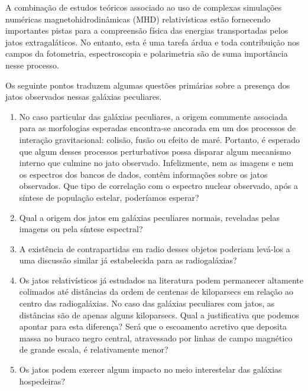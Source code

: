 A combinação de estudos teóricos \cite{blandford1977electromagnetic,blandford1982hydromagnetic,  begelman1984theory,  punsly1990ergosphere, ferrari1998modeling, meier2001magnetohydrodynamic} associado ao uso de complexas simulações numéricas magnetohidrodinâmicas (MHD) relativísticas \cite{koide2000general, koide2003magnetic, mckinney2004measurement, de2005magnetically, komissarov2005observations, hawley2006magnetically, mckinney2006general, mckinney2007disc, punsly2007three, tchekhovskoy2008simulations} estão fornecendo importantes pistas para a compreensão física das energias transportadas pelos jatos extragaláticos. No entanto, esta é uma tarefa árdua e toda contribuição nos campos da fotometria, espectroscopia e polarimetria são de suma importância nesse processo.

Os seguinte pontos traduzem algumas questões primárias sobre a presença dos jatos observados nessas galáxias peculiares.

\begin{enumerate}
    
    \item No caso particular das galáxias peculiares, a origem comumente associada para as morfologias esperadas encontra-se ancorada em um dos processos de interação gravitacional: colisão, fusão ou efeito de maré. Portanto, é esperado que algum desses processos perturbativos possa disparar algum mecanismo interno que culmine no jato observado. Infelizmente, nem as imagens e nem os espectros dos bancos de dados, contêm informações sobre os jatos observados. Que tipo de correlação com o espectro nuclear observado, após a síntese de população estelar, poderíamos esperar?
    
    \item Qual a origem dos jatos em galáxias peculiares normais, reveladas pelas imagens ou pela síntese espectral?
    
    \item A existência de contrapartidas em radio desses objetos poderiam levá-los a uma discussão similar já estabelecida para as radiogaláxias?

    \item Os jatos relativísticos já estudados na literatura podem permanecer altamente colimados até distâncias da ordem de centenas de kiloparsecs em relação ao centro das radiogaláxias. No caso das galáxias peculiares com jatos, as distâncias são de apenas alguns kiloparsecs. Qual a justificativa que podemos apontar para esta diferença? Será que o escoamento acretivo que deposita massa no buraco negro central, atravessado por linhas de campo magnético de grande escala, é relativamente menor?

    \item Os jatos podem exercer algum impacto no meio interestelar das galáxias hospedeiras?

\end{enumerate}


